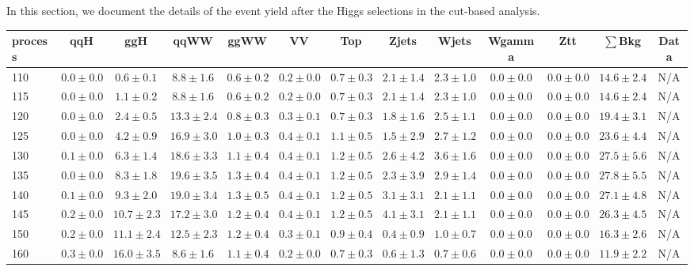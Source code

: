 In this section, we document the details of the event yield after the Higgs 
selections in the cut-based analysis.

\begin{table}
{%
 \tiny
 \begin{center}
 \begin{tabular}{l | c c | c c c c c c c c  | c c}
 \hline
 process & qqH & ggH & qqWW & ggWW & VV & Top & Zjets & Wjets & Wgamma & Ztt & $\sum$Bkg & Data \\
 \hline
110 & $0.0\pm0.0$ & $0.6\pm0.1$ & $8.8\pm1.6$ & $0.6\pm0.2$ & $0.2\pm0.0$ & $0.7\pm0.3$ & $2.1\pm1.4$ & $2.3\pm1.0$ & $0.0\pm0.0$ & $0.0\pm0.0$ & $14.6\pm2.4$ & N/A \\ 
115 & $0.0\pm0.0$ & $1.1\pm0.2$ & $8.8\pm1.6$ & $0.6\pm0.2$ & $0.2\pm0.0$ & $0.7\pm0.3$ & $2.1\pm1.4$ & $2.3\pm1.0$ & $0.0\pm0.0$ & $0.0\pm0.0$ & $14.6\pm2.4$ & N/A \\ 
120 & $0.0\pm0.0$ & $2.4\pm0.5$ & $13.3\pm2.4$ & $0.8\pm0.3$ & $0.3\pm0.1$ & $0.7\pm0.3$ & $1.8\pm1.6$ & $2.5\pm1.1$ & $0.0\pm0.0$ & $0.0\pm0.0$ & $19.4\pm3.1$ & N/A \\
125 & $0.0\pm0.0$ & $4.2\pm0.9$ & $16.9\pm3.0$ & $1.0\pm0.3$ & $0.4\pm0.1$ & $1.1\pm0.5$ & $1.5\pm2.9$ & $2.7\pm1.2$ & $0.0\pm0.0$ & $0.0\pm0.0$ & $23.6\pm4.4$ & N/A \\
130 & $0.1\pm0.0$ & $6.3\pm1.4$ & $18.6\pm3.3$ & $1.1\pm0.4$ & $0.4\pm0.1$ & $1.2\pm0.5$ & $2.6\pm4.2$ & $3.6\pm1.6$ & $0.0\pm0.0$ & $0.0\pm0.0$ & $27.5\pm5.6$ & N/A \\
135 & $0.0\pm0.0$ & $8.3\pm1.8$ & $19.6\pm3.5$ & $1.3\pm0.4$ & $0.4\pm0.1$ & $1.2\pm0.5$ & $2.3\pm3.9$ & $2.9\pm1.4$ & $0.0\pm0.0$ & $0.0\pm0.0$ & $27.8\pm5.5$ & N/A \\
140 & $0.1\pm0.0$ & $9.3\pm2.0$ & $19.0\pm3.4$ & $1.3\pm0.5$ & $0.4\pm0.1$ & $1.2\pm0.5$ & $3.1\pm3.1$ & $2.1\pm1.1$ & $0.0\pm0.0$ & $0.0\pm0.0$ & $27.1\pm4.8$ & N/A \\
145 & $0.2\pm0.0$ & $10.7\pm2.3$ & $17.2\pm3.0$ & $1.2\pm0.4$ & $0.4\pm0.1$ & $1.2\pm0.5$ & $4.1\pm3.1$ & $2.1\pm1.1$ & $0.0\pm0.0$ & $0.0\pm0.0$ & $26.3\pm4.5$ & N/A \\
150 & $0.2\pm0.0$ & $11.1\pm2.4$ & $12.5\pm2.3$ & $1.2\pm0.4$ & $0.3\pm0.1$ & $0.9\pm0.4$ & $0.4\pm0.9$ & $1.0\pm0.7$ & $0.0\pm0.0$ & $0.0\pm0.0$ & $16.3\pm2.6$ & N/A \\
160 & $0.3\pm0.0$ & $16.0\pm3.5$ & $8.6\pm1.6$ & $1.1\pm0.4$ & $0.2\pm0.0$ & $0.7\pm0.3$ & $0.6\pm1.3$ & $0.7\pm0.6$ & $0.0\pm0.0$ & $0.0\pm0.0$ & $11.9\pm2.2$ & N/A \\ 

\end{tabular}
\end{center}}
\end{table}
